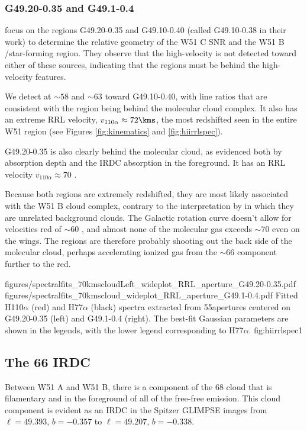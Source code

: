 \subsubsection{G49.20-0.35 and G49.1-0.4}
\citet{Tian2013a} focus on the \hii regions G49.20-0.35 and G49.10-0.40 (called
G49.10-0.38 in their work) to determine the relative geometry
of the W51 C SNR and the W51 B \hii/star-forming region.  They observe that the
high-velocity \hi is not detected toward either of these sources, indicating
that the \hii regions must be behind the high-velocity \hi features.

We detect \formaldehyde \oneone at $\sim58$ and $\sim63$ \kms toward
G49.10-0.40, with line ratios that are consistent with the \hii region being
behind the molecular cloud complex.  It also has an extreme RRL velocity,
$v_{110\alpha} \approx 72\kms$, the most redshifted seen in the entire W51 region
(see Figures \ref{fig:kinematics} and \ref{fig:hiirrlspec}).

G49.20-0.35 is also clearly behind the molecular cloud, as evidenced both by
\formaldehyde absorption depth and the IRDC absorption in the foreground.
It has an RRL velocity $v_{110\alpha} \approx 70$ \kms.

Because both \hii regions are extremely redshifted, they are most likely
associated with the W51 B cloud complex, contrary to the interpretation by
\citet{Tian2013a} in which they are unrelated background clouds.  The Galactic
rotation curve doesn't allow for velocities red of $\sim60$ \kms, and almost
none of the molecular gas exceeds $\sim70$ \kms even on the wings.  The \hii
regions are therefore probably shooting out the back side of the molecular
cloud, perhaps accelerating ionized gas from the $\sim 66$ \kms component
further to the red.

\FigureTwo
{figures/spectralfits_70kmscloudLeft_wideplot_RRL_aperture_G49.20-0.35.pdf}
{figures/spectralfits_70kmscloud_wideplot_RRL_aperture_G49.1-0.4.pdf}
{Fitted H110$\alpha$ (red) and H77$\alpha$ (black) spectra extracted from
55\arcsec apertures centered on G49.20-0.35 (left) and G49.1-0.4 (right).
The best-fit Gaussian parameters are shown in the legends, with the lower
legend corresponding to H77$\alpha$.}
{fig:hiirrlspec}{1}

\subsection{The 66 \kms IRDC}
Between W51 A and W51 B, there is a component of the 68 \kms cloud that is
filamentary and in the foreground of all of the free-free emission.
This cloud component is evident as an IRDC in the Spitzer GLIMPSE images from
$\ell=49.393$, $b=-0.357$ to $\ell=49.207$, $b=-0.338$.

